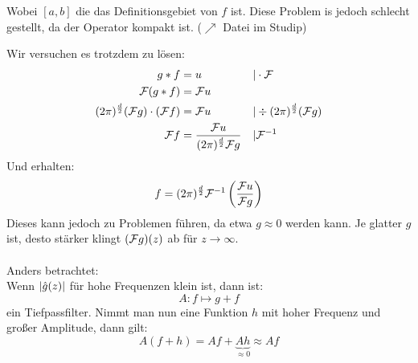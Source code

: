 \begin{enumerate}
            \begin{center}
            \end{center}
            Wobei $[a,b]$ die das Definitionsgebiet von $f$ ist.
            Diese Problem is jedoch schlecht gestellt, da der Operator kompakt ist. ($\nearrow$ Datei im Studip)
    \end{enumerate}

    Wir versuchen es trotzdem zu lösen:
    \begin{align*}
        g*f&=u & &|\cdot \mathcal{F}\\
        \mathcal{F}(g * f)&= \mathcal{F} u \\
        (2 \pi)^\frac{d}{2}(\mathcal{F} g)\cdot (\mathcal{F} f)&= \mathcal{F} u & &| \div (2 \pi)^\frac{d}{2}(\mathcal{F} g)\\
        \mathcal{F} f &= \frac{\mathcal{F} u}{(2 \pi)^\frac{d}{2} \mathcal{F} g} & &| \mathcal{F}^{-1}
    \end{align*}
    Und erhalten:
    \begin{equation}
        f= (2 \pi)^\frac{d}{2} \mathcal{F}^{-1}\left(\frac{\mathcal{F} u}{\mathcal{F} g}\right)
    \end{equation}
    Dieses kann jedoch zu Problemen führen, da etwa $g \approx 0$ werden kann.
    Je glatter $g$ ist, desto stärker klingt $(\mathcal{F} g)(z)$ ab für $z \to \infty$.\\
    \ \\
    Anders betrachtet:\\
    Wenn $\left\lvert \hat g(z) \right\rvert$ für hohe Frequenzen klein ist, dann ist:
    \[A:f \mapsto g +f\]
    ein Tiefpassfilter. Nimmt man nun eine Funktion $h$ mit hoher Frequenz und großer Amplitude, dann gilt:
    \[A(f + h) = Af + \underbrace{Ah}_{\approx 0} \approx Af\]
    
